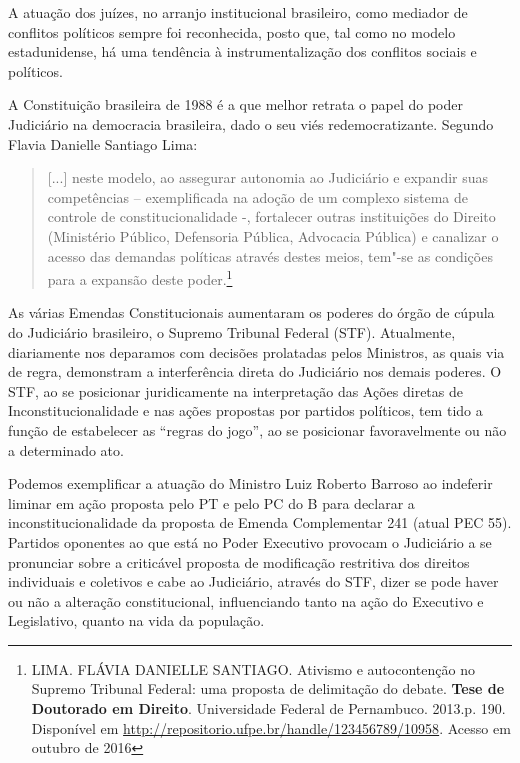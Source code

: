 {A atuação dos juízes, no arranjo institucional brasileiro, como mediador
de conflitos políticos sempre foi reconhecida, posto que, tal como no
modelo estadunidense, há uma tendência à instrumentalização dos
conflitos sociais e políticos.

A Constituição brasileira de 1988 é a que melhor retrata o papel do
poder Judiciário na democracia brasileira, dado o seu viés
redemocratizante. Segundo Flavia Danielle Santiago Lima:

\begin{quote}
{[}...{]} neste modelo, ao assegurar autonomia ao Judiciário e expandir
suas competências -- exemplificada na adoção de um complexo sistema de
controle de constitucionalidade -, fortalecer outras instituições do
Direito (Ministério Público, Defensoria Pública, Advocacia Pública) e
canalizar o acesso das demandas políticas através destes meios, tem"-se
as condições para a expansão deste poder.\footnote{LIMA. FLÁVIA DANIELLE
  SANTIAGO. Ativismo e autocontenção no Supremo Tribunal Federal: uma
  proposta de delimitação do debate. \textbf{Tese de Doutorado em
  Direito}. Universidade Federal de Pernambuco. 2013.p. 190. Disponível
  em
  \href{http://repositorio.ufpe.br/handle/123456789/10958}{{http://repositorio.ufpe.br/handle/123456789/10958}}.
  Acesso em outubro de 2016}
\end{quote}

As várias Emendas Constitucionais aumentaram os poderes do órgão de
cúpula do Judiciário brasileiro, o Supremo Tribunal Federal (STF).
Atualmente, diariamente nos deparamos com decisões prolatadas pelos
Ministros, as quais via de regra, demonstram a interferência direta do
Judiciário nos demais poderes. O STF, ao se posicionar juridicamente na
interpretação das Ações diretas de Inconstitucionalidade e nas ações
propostas por partidos políticos, tem tido a função de estabelecer as
``regras do jogo'', ao se posicionar favoravelmente ou não a determinado
ato.

Podemos exemplificar a atuação do Ministro Luiz Roberto Barroso ao
indeferir liminar em ação proposta pelo PT e pelo PC do B para declarar
a inconstitucionalidade da proposta de Emenda Complementar 241 (atual
PEC 55). Partidos oponentes ao que está no Poder Executivo provocam o
Judiciário a se pronunciar sobre a criticável proposta de modificação
restritiva dos direitos individuais e coletivos e cabe ao Judiciário,
através do STF, dizer se pode haver ou não a alteração constitucional,
influenciando tanto na ação do Executivo e Legislativo, quanto na vida
da população.

}
